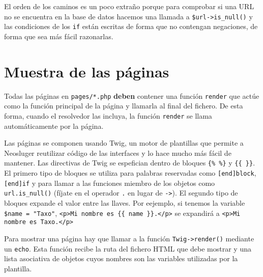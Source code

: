 El orden de los caminos es un poco extraño porque para comprobar si una URL no se encuentra en la base de datos hacemos una llamada a \texttt{\$url->is\_null()} y las condiciones de los \texttt{if} están escritas de forma que no contengan negaciones, de forma que sea más fácil razonarlas.

\section{Muestra de las páginas}\label{muestra-de-las-paginas}

Todas las páginas en \texttt{pages/*.php} \textbf{deben} contener una función \texttt{render} que actúe como la función principal de la página y llamarla al final del fichero.
De esta forma, cuando el resolvedor las incluya, la función \texttt{render} se llama automáticamente por la página.

Las páginas se componen usando Twig, un motor de plantillas que permite a Neosluger reutilizar código de las interfaces y lo hace mucho más fácil de mantener.
Las directivas de Twig se espefician dentro de bloques \texttt{\{\% \%\}} y \texttt{\{\{ \}\}}.
El primero tipo de bloques se utiliza para palabras reservadas como \texttt{[end]block}, \texttt{[end]if} y para llamar a las funciones miembro de los objetos como \texttt{url.is\_null()} (fíjate en el operador \texttt{.} en lugar de \texttt{->}).
El segundo tipo de bloques expande el valor entre las llaves.
Por eejemplo, si tenemos la variable \texttt{\$name = "Taxo"}, \texttt{<p>Mi nombre es \{\{ name \}\}.</p>} se expandirá a \texttt{<p>Mi nombre es Taxo.</p>}

Para mostrar una página hay que llamar a la función \texttt{Twig->render()} mediante un \texttt{echo}.
Esta función recibe la ruta del fichero HTML que debe mostrar y una lista asociativa de objetos cuyos nombres son las variables utilizadas por la plantilla.
